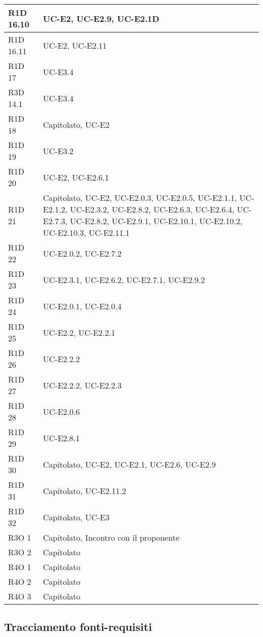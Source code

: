 \begin{center}
\begin{longtable}{ | l | p{8cm} | }
    R1D 16.10 & UC-E2, UC-E2.9, UC-E2.1D \\ \hline
    R1D 16.11 & UC-E2, UC-E2.11 \\ \hline
    R1D 17 &  UC-E3.4  \\ \hline
    R3D 14.1 & UC-E3.4 \\ \hline
    R1D 18 & Capitolato, UC-E2  \\ \hline
    R1D 19 & UC-E3.2 \\ \hline
    R1D 20 & UC-E2, UC-E2.6.1 \\ \hline
    R1D 21 & Capitolato, UC-E2, UC-E2.0.3, UC-E2.0.5, UC-E2.1.1, UC-E2.1.2, UC-E2.3.2, UC-E2.8.2, UC-E2.6.3, UC-E2.6.4, UC-E2.7.3, UC-E2.8.2, UC-E2.9.1, UC-E2.10.1, UC-E2.10.2, UC-E2.10.3, UC-E2.11.1 \\ \hline
    R1D 22 & UC-E2.0.2, UC-E2.7.2 \\ \hline
    R1D 23 & UC-E2.3.1, UC-E2.6.2, UC-E2.7.1, UC-E2.9.2 \\ \hline
    R1D 24 & UC-E2.0.1, UC-E2.0.4 \\ \hline
    R1D 25 & UC-E2.2, UC-E2.2.1 \\ \hline
    R1D 26 & UC-E2.2.2 \\ \hline
    R1D 27 & UC-E2.2.2, UC-E2.2.3  \\ \hline
    R1D 28 & UC-E2.0.6  \\ \hline
    R1D 29 & UC-E2.8.1 \\ \hline
    R1D 30 & Capitolato, UC-E2, UC-E2.1, UC-E2.6, UC-E2.9 \\ \hline
    R1D 31 & Capitolato, UC-E2.11.2 \\ \hline
    R1D 32 & Capitolato, UC-E3 \\ \hline
    R3O 1 & Capitolato, Incontro con il proponente\\ \hline
    R3O 2 & Capitolato \\ \hline
    R4O 1 & Capitolato \\ \hline
    R4O 2 & Capitolato \\ \hline
    R4O 3 & Capitolato \\ \hline
    \end{longtable}
  \egroup
\end{center} 

\subsection{Tracciamento fonti-requisiti}


